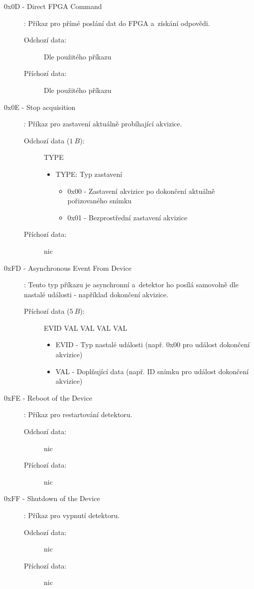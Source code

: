 \begin{description}
\begin{description}
\begin{itemize}
				\end{itemize}
		\end{description}
	\item[0x0D - Direct FPGA Command]:
		Příkaz pro přímé poslání dat do FPGA a~získání odpovědi.
		\begin{description}
			\item[Odchozí data:] Dle použitého příkazu
			\item[Příchozí data:] Dle použitého příkazu
		\end{description}
	\item[0x0E - Stop acquisition]:
		Příkaz pro zastavení aktuálně probíhající akvizice.
		\begin{description}
			\item[Odchozí data ($1~B$):] TYPE
				\begin{itemize}
					\item TYPE: Typ zastavení
						\begin{itemize}
							\item 0x00 - Zastavení akvizice po dokončení aktuálně pořizovaného snímku
							\item 0x01 - Bezprostřední zastavení akvizice 
						\end{itemize}
				\end{itemize}
			\item[Příchozí data:] nic
		\end{description}
	\item[0xFD - Asynchronous Event From Device]:
		Tento typ příkazu je asynchronní a~detektor ho posílá samovolně dle nastalé události - například dokončení akvizice.
		\begin{description}
			\item[Příchozí data ($5~B$):] EVID VAL VAL VAL VAL
				\begin{itemize}
					\item EVID - Typ nastalé události (např. 0x00 pro událost dokončení akvizice)
					\item VAL - Doplňující data (např. ID snímku pro událost dokončení akvizice)
				\end{itemize}
		\end{description}
	\item[0xFE - Reboot of the Device]:
		Příkaz pro restartování detektoru.
		\begin{description}
			\item[Odchozí data:] nic
			\item[Příchozí data:] nic
		\end{description}
	\item[0xFF - Shutdown of the Device]:
		Příkaz pro vypnutí detektoru.
		\begin{description}
			\item[Odchozí data:] nic
			\item[Příchozí data:] nic
		\end{description}
\end{description}


